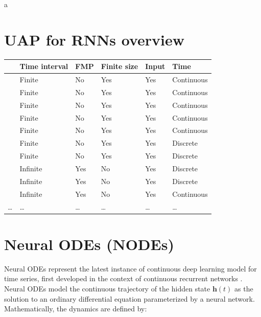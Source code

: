 \documentclass{article}
\theoremstyle{definition}
\theoremstyle{remark}
\newcounter{ct}
\begin{document}
a\citep{marchi2021training}




\section{UAP for RNNs overview}

\begin{table}[h]
\begin{tabular}{|l|l|l|l|l|l|}
\cline{2-6}
    \multicolumn{1}{c|}{}							%
 						&  Time interval & FMP	& Finite size 		&  Input     	&     Time   \\\cline{2-6}\hline
\citet{cybenko1989approximation} 	& Finite	& No 	& Yes 			&  Yes		&	Continuous\\\hline  %
\citet{funahashi1989approximate} 	& Finite	& No		& Yes			&  Yes		&	Continuous\\\hline  %
\citet{hornik1989multilayer} 		& Finite	& No 	& Yes			& Yes		&	Continuous\\\hline  %
\citet{funahashi1993approximation} 	& Finite	& No		& Yes			&  Yes		&	Continuous\\\hline
\citet{jin1995approximation}		& Finite	& No		& Yes			& Yes		&	Continuous	\\\hline
\citet{hammer2000approximation}	& Finite     & No 	& Yes			& Yes		& 	Discrete	\\\hline
\citet{jin1995universal}			& Finite	& No		& Yes			& Yes		&	Discrete	\\\hline
\citet{bai2019deq} 				& Infinite	& Yes	& No		 	& Yes 			&	Discrete		\\\hline
\citet{schafer2007uap} 			& Infinite 	& Yes	& No			& Yes 			&	Discrete\\\hline
\citet{wang2024state}			& Infinite   & Yes 	& No 		& Yes			& 	Continuous\\\hline %
\dots&\dots &\dots&\dots&\dots&\dots\\
\end{tabular}
\end{table}

\section{Neural ODEs (NODEs)}
Neural ODEs \citep{chen2018neural} represent the latest instance of continuous deep learning model for time series, first developed in the context of continuous recurrent networks \citep{cohen1983absolute}.
%
Neural ODEs model the continuous trajectory of the hidden state \( \mathbf{h}(t) \) as the solution to an ordinary differential equation parameterized by a neural network. Mathematically, the dynamics are defined by:
\end{document}
